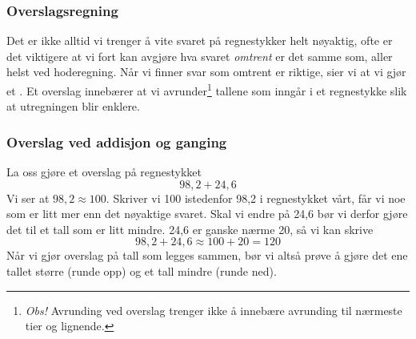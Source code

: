
\subsubsection{Overslagsregning}
Det er ikke alltid vi trenger å vite svaret på regnestykker helt nøyaktig, ofte er det viktigere at vi fort kan avgjøre hva svaret \textsl{omtrent} er det samme som, aller helst ved hoderegning. Når vi finner svar som omtrent er riktige, sier vi at vi gjør et . Et overslag innebærer at vi avrunder\footnote{\textit{Obs!} Avrunding ved overslag trenger ikke å innebære avrunding til nærmeste tier og lignende.} tallene som inngår i et regnestykke slik at utregningen blir enklere. \vsk



\subsubsection{Overslag ved addisjon og ganging}
La oss gjøre et overslag på regnestykket
\[ 98,2+24,6 \]
Vi ser at $ 98,2 \approx 100 $. Skriver vi 100 istedenfor 98,2 i regnestykket vårt, får vi noe som er litt mer enn det nøyaktige svaret. Skal vi endre på 24,6 bør vi derfor gjøre det til et tall som er litt mindre. 24,6 er ganske nærme 20, så vi kan skrive
\[ 98,2+24,6 \approx 100 + 20 = 120 \]
Når vi gjør overslag på tall som legges sammen, bør vi altså prøve å gjøre det ene tallet større (runde opp) og et tall mindre (runde ned).\\


